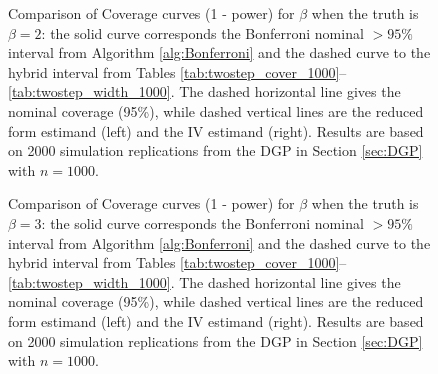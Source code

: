\begin{figure}
  \centering
  \caption{Comparison of Coverage curves (1 - power) for $\beta$ when the truth is $\beta = 2$: the solid curve corresponds the Bonferroni nominal $>95\%$ interval from Algorithm \ref{alg:Bonferroni} and the dashed curve to the hybrid interval from Tables \ref{tab:twostep_cover_1000}--\ref{tab:twostep_width_1000}. The dashed horizontal line gives the nominal coverage (95\%), while dashed vertical lines are the reduced form estimand (left) and the IV estimand (right). Results are based on 2000 simulation replications from the DGP in Section \ref{sec:DGP} with $n = 1000$.}
  \label{fig:2step_2_1000}
\end{figure}

\begin{figure}
  \centering
  \caption{Comparison of Coverage curves (1 - power) for $\beta$ when the truth is $\beta = 3$: the solid curve corresponds the Bonferroni nominal $>95\%$ interval from Algorithm \ref{alg:Bonferroni} and the dashed curve to the hybrid interval from Tables \ref{tab:twostep_cover_1000}--\ref{tab:twostep_width_1000}. The dashed horizontal line gives the nominal coverage (95\%), while dashed vertical lines are the reduced form estimand (left) and the IV estimand (right). Results are based on 2000 simulation replications from the DGP in Section \ref{sec:DGP} with $n = 1000$.}
  \label{fig:2step_3_1000}
\end{figure}
